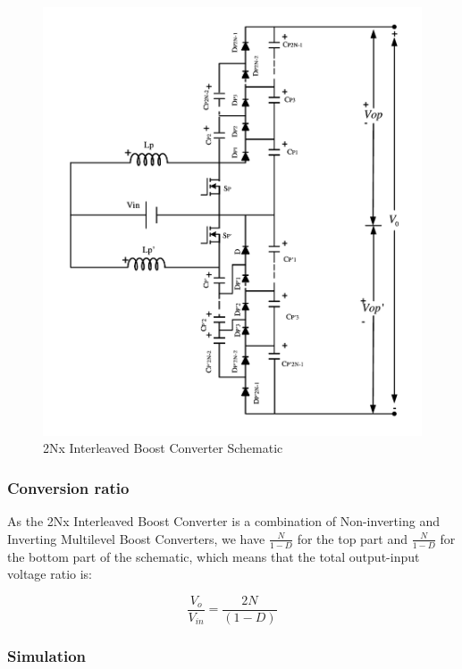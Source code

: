\begin{figure}[H]
   \centering
   \includegraphics[width=\textwidth]{figures/yMultilevel/2Nx_full.pdf}
    \caption{2Nx Interleaved Boost Converter Schematic}
	\label{fig:MBC_2NxSchematic}
\end{figure}

\subsubsection{Conversion ratio}

As the 2Nx Interleaved Boost Converter is a combination of Non-inverting and Inverting Multilevel Boost Converters, we have $\frac{N}{1-D}$ for the top part and $\frac{N}{1-D}$ for the bottom part of the schematic, which means that the total output-input voltage ratio is:

\begin{equation}
	\frac{V_o}{V_{in}} = \frac{2N}{(1-D)}
	\label{eq:MBC_2NxCR}
\end{equation}

\subsubsection{Simulation}

